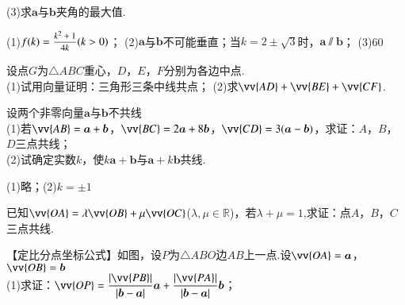 \begin{Theorem}[平面向量基本定理]
\begin{exercise}
      (3)求$\bm a$与$\bm b$夹角的最大值.
      \begin{answer}
        (1)$f(k)=\mfrac{k^2+1}{4k} (k>0)$；
        (2)$\bm a$与$\bm b$不可能垂直；当$k=2\pm\sqrt{3}$时，$\bm a\varparallel \bm b$；
        (3)60\degree
      \end{answer}
    \vspace{5.5cm}
    \item
      设点$G$为$\triangle ABC$重心，$D$，$E$，$F$分别为各边中点.\\
      (1)试用向量证明：三角形三条中线共点；
      (2)求$\vv{AD}+\vv{BE}+\vv{CF}$.
      \begin{flushright}
      \end{flushright}
    \vspace{3cm}
    \item%
      设两个非零向量$\bm a$与$\bm b$不共线\\
      (1)若$\vv{AB}=\bm a+\bm b$，$\vv{BC}=2\bm a+8\bm b$，$\vv{CD}=3(\bm a-\bm b)$，求证：$A$，$B$，$D$三点共线；\\
      (2)试确定实数$k$，使$k\bm a+\bm b$与$\bm a+k\bm b$共线.
      \begin{answer}
        (1)略；(2)$k=\pm1$
      \end{answer}
    \vspace{7cm}
    \item
      已知$\vv{OA}=\lambda\vv{OB}+\mu\vv{OC}$($\lambda,\mu\in\mathbb{R}$)，若$\lambda+\mu=1$,求证：点$A$，$B$，$C$三点共线.\\
    \vspace{4cm}
    \item
      【定比分点坐标公式】如图，设$P$为$\triangle ABO$边$AB$上一点.设$\vv{OA}=\bm a$，$\vv{OB}=\bm b$\vspace{8pt}\\
      (1)求证：$\vv{OP}=\dfrac{\abs{\vv{PB}}}{\abs{\bm b-\bm a}}\bm a+\dfrac{\abs{\vv{PA}}}{\abs{\bm b-\bm a}}\bm b$；\vspace{8pt}\\

\end{exercise}
\end{Theorem}

